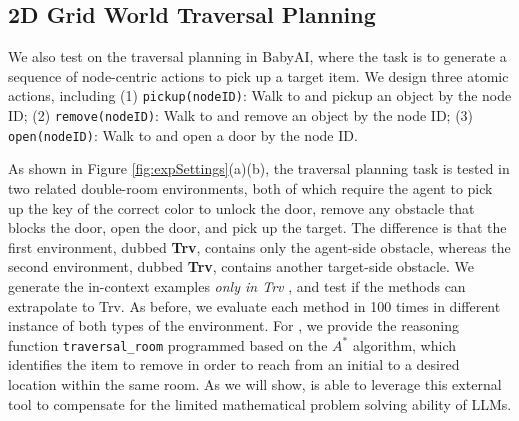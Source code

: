 \subsection{2D Grid World Traversal Planning}
\label{sec:BabyAITrv}
We also test on the traversal planning in BabyAI, where the task is to generate a sequence of node-centric actions to pick up a target item. We design three atomic actions, including (1) \texttt{\small pickup(nodeID)}: Walk to and pickup an object by the node ID; (2) \texttt{\small remove(nodeID)}: Walk to and remove an object by the node ID; (3) \texttt{\small open(nodeID)}: Walk to and open a door by the node ID. 

As shown in Figure \ref{fig:expSettings}(a)(b), the traversal planning task is tested in two related double-room environments, both of which require the agent to pick up the key of the correct color to unlock the door, remove any obstacle that blocks the door, open the door, and pick up the target. The difference is that the first environment, dubbed \textbf{Trv}, contains only the agent-side obstacle, whereas the second environment, dubbed \textbf{Trv}, contains another target-side obstacle. We generate the in-context examples \textit{only in Trv} , and test if the methods can extrapolate to Trv. As before, we evaluate each method in 100 times in different instance of both types of the environment. For \RwR, we provide the reasoning function \texttt{\small traversal\_room} programmed based on the $A^*$ algorithm, which identifies the item to remove in order to reach from an initial to a desired location within the same room.  As we will show, \RwR is able to leverage this external tool to compensate for the limited mathematical problem solving ability of LLMs.

